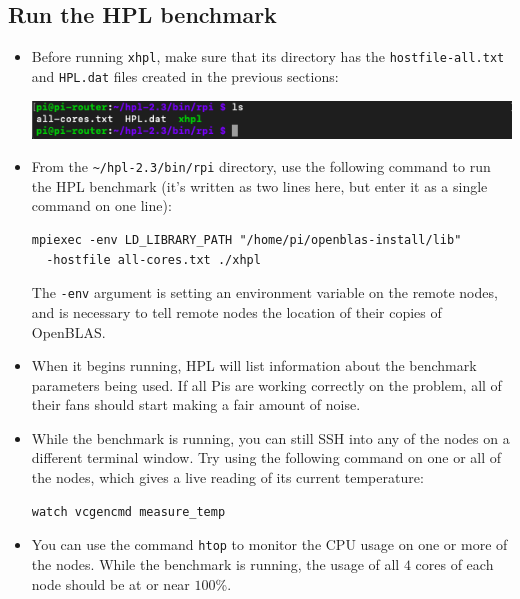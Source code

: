 \documentclass{article}
\newcommand{\tttilde}[0]{\textasciitilde{}}
\begin{document}
\subsection{Run the HPL benchmark}

\begin{itemize}
    \item Before running \texttt{xhpl}, make sure that its directory has the \texttt{hostfile-all.txt} and \texttt{HPL.dat} files created in the previous sections:
    
    \includegraphics[width=\textwidth]{images/bin-before-xhpl.png}

    \item From the \texttt{\tttilde/hpl-2.3/bin/rpi} directory, use the following command to run the HPL benchmark (it's written as two lines here, but enter it as a single command on one line):
    
\begin{verbatim}
mpiexec -env LD_LIBRARY_PATH "/home/pi/openblas-install/lib"
  -hostfile all-cores.txt ./xhpl    
\end{verbatim}

    The \texttt{-env} argument is setting an environment variable on the remote nodes, and is necessary to tell remote nodes the location of their copies of OpenBLAS.
    
    \item When it begins running, HPL will list information about the benchmark parameters being used. If all Pis are working correctly on the problem, all of their fans should start making a fair amount of noise.
    
    \item While the benchmark is running, you can still SSH into any of the nodes on a different terminal window. Try using the following command on one or all of the nodes, which gives a live reading of its current temperature:
\begin{verbatim}
watch vcgencmd measure_temp
\end{verbatim}

    \item You can use the command \texttt{htop} to monitor the CPU usage on one or more of the nodes. While the benchmark is running, the usage of all $4$ cores of each node should be at or near $100$\%. 
    

\end{itemize}
\end{document}
